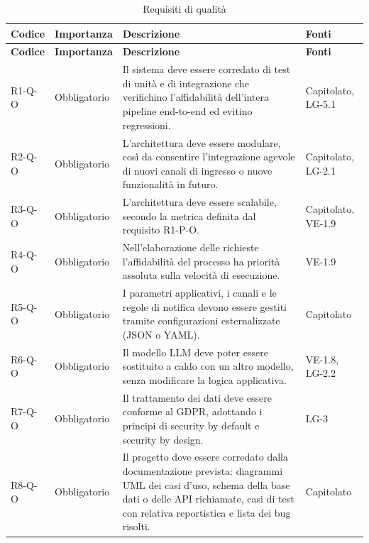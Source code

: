 {
    \small
    \renewcommand{\arraystretch}{1.3}
    \begin{longtable}{|>{\raggedright\arraybackslash}p{1.8cm}|>{\raggedright\arraybackslash}p{2.3cm}|>{\raggedright\arraybackslash}p{6.6cm}|>{\raggedright\arraybackslash}p{3.1cm}|}
    \caption{Requisiti di qualità}\label{tab:req-qualita}\\
    \hline
    \rowcolor[gray]{0.88} \textbf{Codice} & \textbf{Importanza} & \textbf{Descrizione} & \textbf{Fonti} \\ \hline
    \endfirsthead
    \hline
    \rowcolor[gray]{0.88} \textbf{Codice} & \textbf{Importanza} & \textbf{Descrizione} & \textbf{Fonti} \\ \hline
    \endhead
    \mbox{R1-Q-O} & Obbligatorio & Il sistema deve essere corredato di test di unità e di integrazione che verifichino l'affidabilità dell'intera pipeline end-to-end ed evitino regressioni. & \mbox{Capitolato}, \mbox{LG-5.1} \\ \hline
    \mbox{R2-Q-O} & Obbligatorio & L'architettura deve essere modulare, così da consentire l'integrazione agevole di nuovi canali di ingresso o nuove funzionalità in futuro. & \mbox{Capitolato}, \mbox{LG-2.1} \\ \hline
    \mbox{R3-Q-O} & Obbligatorio & L'architettura deve essere scalabile, secondo la metrica definita dal requisito R1-P-O. & \mbox{Capitolato}, \mbox{VE-1.9} \\ \hline
    \mbox{R4-Q-O} & Obbligatorio & Nell'elaborazione delle richieste l'affidabilità del processo ha priorità assoluta sulla velocità di esecuzione. & \mbox{VE-1.9} \\ \hline
    \mbox{R5-Q-O} & Obbligatorio & I parametri applicativi, i canali e le regole di notifica devono essere gestiti tramite configurazioni esternalizzate (JSON o YAML). & \mbox{Capitolato} \\ \hline
    \mbox{R6-Q-O} & Obbligatorio & Il modello LLM deve poter essere sostituito a caldo con un altro modello, senza modificare la logica applicativa. & \mbox{VE-1.8}, \mbox{LG-2.2} \\ \hline
    \mbox{R7-Q-O} & Obbligatorio & Il trattamento dei dati deve essere conforme al GDPR, adottando i principi di security by default e security by design. & \mbox{LG-3} \\ \hline
    \mbox{R8-Q-O} & Obbligatorio & Il progetto deve essere corredato dalla documentazione prevista: diagrammi UML dei casi d'uso, schema della base dati o delle API richiamate, casi di test con relativa reportistica e lista dei bug risolti. & \mbox{Capitolato} \\ \hline

\end{longtable}}
